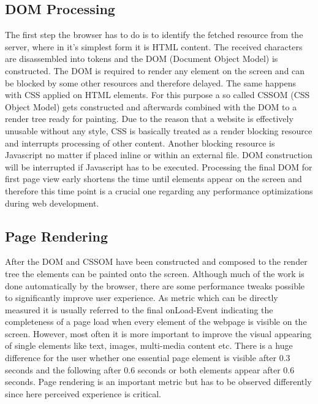 \subsection{DOM Processing}
The first step the browser has to do is to identify the fetched resource from the server, where in it's simplest form it is HTML content. The received characters are disassembled into tokens and the DOM (Document Object Model) is constructed. The DOM is required to render any element on the screen and can be blocked by some other resources and therefore delayed. The same happens with CSS applied on HTML elements. For this purpose a so called CSSOM (CSS Object Model) gets constructed and afterwards combined with the DOM to a render tree ready for painting. Due to the reason that a website is effectively unusable without any style, CSS is basically treated as a render blocking resource and interrupts processing of other content. Another blocking resource is Javascript no matter if placed inline or within an external file. DOM construction will be interrupted if Javascript has to be executed. Processing the final DOM for first page view early shortens the time until elements appear on the screen and therefore this time point is a crucial one regarding any performance optimizations during web development. \cite{GoogleDev} 

\subsection{Page Rendering}
After the DOM and CSSOM have been constructed and composed to the render tree the elements can be painted onto the screen. Although much of the work is done automatically by the browser, there are some performance tweaks possible to significantly improve user experience. As metric which can be directly measured it is usually referred to the final onLoad-Event indicating the completeness of a page load when every element of the webpage is visible on the screen. However, most often it is more important to improve the visual appearing of single elements like text, images, multi-media content etc. There is a huge difference for the user whether one essential page element is visible after 0.3 seconds and the following after 0.6 seconds or both elements appear after 0.6 seconds. Page rendering is an important metric but has to be observed differently since here perceived experience is critical. 